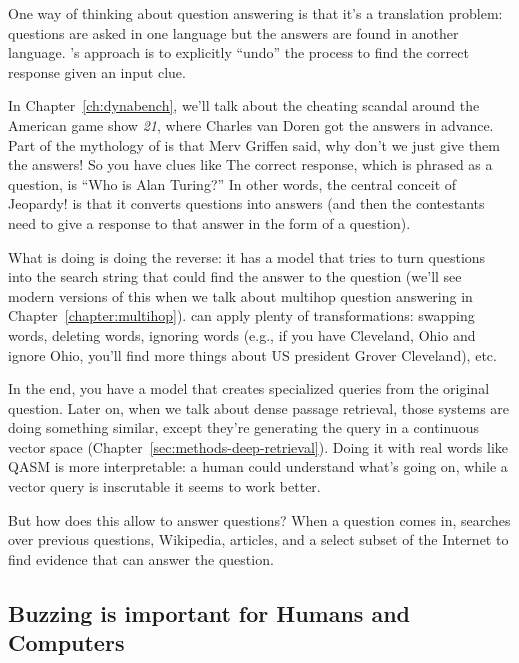 One way of thinking about question answering is that it's a translation
problem: questions are asked in one language but the answers are found in
another language.
%
's approach is to explicitly ``undo'' the process to find the
correct response given an input clue.

In Chapter~\ref{ch:dynabench}, we'll talk about the cheating scandal
around the American game show \textit{21}, where Charles van Doren got
the answers in advance.
%
Part of the mythology of \jeopardy{} is that Merv Griffen said, why
don’t we just give them the answers!
%
So you have clues like 
%
The correct response, which is phrased as a question, is
``Who is Alan Turing?''
%
In other words, the central conceit of Jeopardy! is that it converts questions
into answers (and then the contestants need to give a response to that answer
in the form of a question).

What  is doing is doing the reverse: it has a model that
tries to turn questions into the search string that could find the
answer to the question (we'll see modern versions of this when we talk about
multihop question answering in Chapter~\ref{chapter:multihop}).
%
 can apply plenty of transformations: swapping words,
deleting words, ignoring words (e.g., if you have Cleveland, Ohio and ignore
Ohio, you’ll find more things about US president Grover Cleveland), etc.


In the end, you have a model that creates specialized queries from the
original question.
%
Later on, when we talk about dense passage
retrieval, those systems are doing something similar, except they’re
generating the query in a continuous vector space (Chapter~\ref{sec:methods-deep-retrieval}).
%
Doing it with real words like QASM is more interpretable: a human could
understand what’s going on, while a vector query is inscrutable it seems to
work better.

But how does this allow \watson{} to answer questions?
%
When a question comes in, \watson{} searches over previous \jeopardy{}
questions, Wikipedia, articles, and a select subset of the Internet to find
evidence that can answer the question.

\subsection{Buzzing is important for Humans and Computers}

